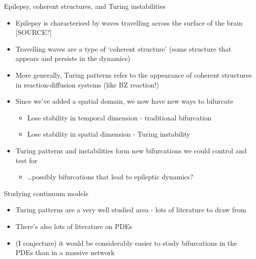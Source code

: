 \documentclass[presentation]{beamer}
\begin{document}
\begin{frame}[label={sec:org09d7f5b}]{Epilepsy, coherent structures, and Turing instabilities}
\begin{itemize}
\item Epilepsy is characterised by waves travelling across the surface of the brain [SOURCE?]
\item Travelling waves are a type of `coherent structure' (some structure that appears and persists in the dynamics)
\item More generally, Turing patterns refer to the appearance of coherent structures in reaction-diffusion systems (like BZ reaction!)
\item Since we've added a spatial domain, we now have new ways to bifurcate
\begin{itemize}
\item Lose stability in temporal dimension - traditional bifurcation
\item Lose stability in spatial dimension - Turing instability
\end{itemize}
\item Turing patterns and instabilities form new bifurcations we could control and test for
\begin{itemize}
\item \ldots{}possibly bifurcations that lead to epileptic dynamics?
\end{itemize}
\end{itemize}
\end{frame}

\begin{frame}[label={sec:orgf9135fe}]{Studying continuum models}
\begin{itemize}
\item Turing patterns are a very well studied area - lots of literature to draw from
\item There's also lots of literature on PDEs
\item (I conjecture) it would be considerably easier to study bifurcations in the PDEs than in a massive network
\end{itemize}
\end{frame}
\end{document}
